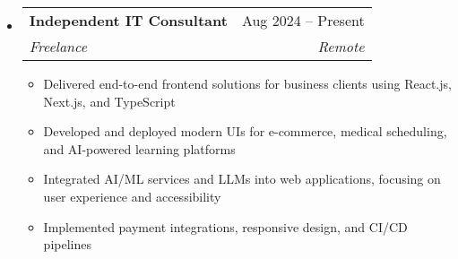 \documentclass[letterpaper,11pt]{article}
\makeatletter
\newcommand{\resumeSubheading}[4]{
  \vspace{-2pt}
  \item[]
  \begin{tabular*}{\textwidth}{@{\extracolsep{\fill}}l r}
    \textbf{#1} & #2 \\
    \textit{#3} & \textit{#4} \\
  \end{tabular*}
  \vspace{-5pt}
}
\makeatother
\begin{document}
\begin{itemize}[leftmargin=0pt, itemindent=0pt, label={}]
\resumeSubheading
{Independent IT Consultant}{Aug 2024 -- Present}
{Freelance}{Remote}
\begin{itemize}[leftmargin=*]
    \item Delivered end-to-end frontend solutions for business clients using React.js, Next.js, and TypeScript
    \item Developed and deployed modern UIs for e-commerce, medical scheduling, and AI-powered learning platforms
    \item Integrated AI/ML services and LLMs into web applications, focusing on user experience and accessibility
    \item Implemented payment integrations, responsive design, and CI/CD pipelines
\end{itemize}
\end{itemize}
\end{document}
